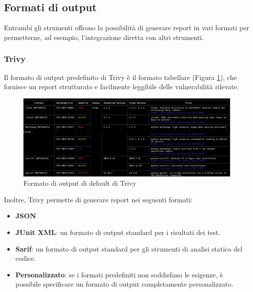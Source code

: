 \subsection{Formati di output}
Entrambi gli strumenti offrono la possibilità di generare report in vari formati per permetterne, ad esempio, l'integrazione diretta con altri strumenti.
\subsubsection{Trivy}
Il formato di output predefinito di Trivy è il formato tabellare (Figura \ref{fig:trivy_output_fmt}), che fornisce un report strutturato e facilmente leggibile delle vulnerabilità rilevate.
\begin{figure}[H]
   \centering
   \includegraphics[width=1\textwidth]{immagini/capitolo2/trivy_output_fmt.png}
   \caption{Formato di output di default di Trivy}
   \label{fig:trivy_output_fmt}
\end{figure}
Inoltre, Trivy permette di generare report nei seguenti formati:
\begin{itemize}
   \item \textbf{JSON}
   \item \textbf{JUnit XML}: un formato di output standard per i risultati dei test.
   \item \textbf{Sarif}: un formato di output standard per gli strumenti di analisi statica del codice.
   \item \textbf{Personalizzato}: se i formati predefiniti non soddisfano le esigenze, è possibile specificare un formato di output completamente personalizzato.
\end{itemize}

